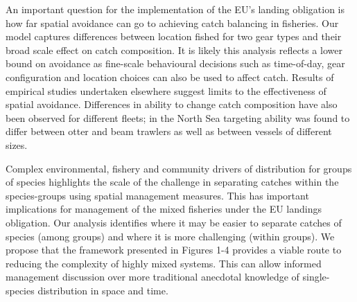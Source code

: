 \documentclass{nature}
\begin{document}
\begin{linenumbers}
An important question for the implementation of the EU's landing obligation is
how far spatial avoidance can go to achieving catch balancing in fisheries.
Our model captures differences between location fished for two gear types and
their broad scale effect on catch composition.  It is
likely this analysis reflects a lower bound on  avoidance as fine-scale behavioural decisions such as
time-of-day, gear configuration and location choices can also be used to affect
catch\cite{Abbott2015, Thorson2016}. Results of empirical studies undertaken
elsewhere\cite{Branch2008, Kuriyama2016} suggest limits to the effectiveness of
spatial avoidance. Differences in ability to change catch composition have also
been observed for different fleets; in the North Sea targeting ability was
found to differ between otter and beam trawlers as well as between vessels of
different sizes\cite{Pascoe2007}.  



Complex environmental, fishery and community drivers of distribution for groups
of species highlights the scale of the challenge in separating catches within
the species-groups using spatial management measures. This has important
implications for management of the mixed fisheries under the EU landings
obligation. Our analysis identifies where it may be easier to separate catches
of species (among groups) and where it is more challenging (within groups). We
propose that the framework presented in Figures 1-4 provides a viable route to
reducing the complexity of highly mixed systems.  This can allow informed
management discussion over more traditional anecdotal knowledge of
single-species distribution in space and time.



\end{linenumbers}
\end{document}

